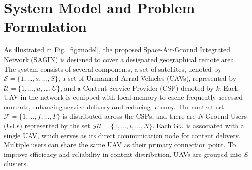 \documentclass[journal]{IEEEtran}
\begin{document}
\section{System Model and Problem Formulation}
As illustrated in Fig. \ref{fig:model}, the proposed Space-Air-Ground Integrated Network (SAGIN) is designed to cover a designated geographical remote area. The system consists of several components, a set of satellites, denoted by \( \mathcal{S} = \{1, \ldots, s, \ldots, S\} \), a set of Unmanned Aerial Vehicles (UAVs), represented by \( \mathcal{U} = \{1, \ldots, u, \ldots, U\} \), and a Content Service Provider (CSP) denoted by $k$. Each UAV in the network is equipped with local memory to cache frequently accessed contents, enhancing service delivery and reducing latency. The content set \( \mathcal{F} = \{1, \ldots, f, \ldots, F\} \) is distributed across the CSPs, and there are \( N \) Ground Users (GUs) represented by the set \( \mathcal{GU} = \{1, \ldots, i, \ldots, N\} \). Each GU is associated with a single UAV, which serves as its direct communication node for content delivery. Multiple users can share the same UAV as their primary connection point. To improve efficiency and reliability in content distribution, UAVs are grouped into \(S\) clusters.
\end{document}
